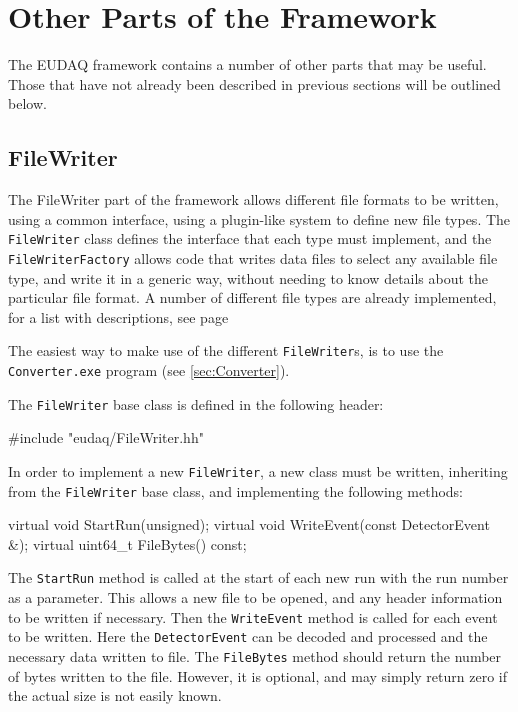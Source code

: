 \section{Other Parts of the Framework}
The EUDAQ framework contains a number of other parts that may be useful.
Those that have not already been described in previous sections will be outlined below.

\subsection{FileWriter}
The FileWriter part of the framework allows different file formats to be written,
using a common interface, using a plugin-like system to define new file types.
The \texttt{FileWriter} class defines the interface that each type must implement,
and the \texttt{FileWriterFactory} allows code that writes data files to select any
available file type, and write it in a generic way,
without needing to know details about the particular file format.
A number of different file types are already implemented,
for a list with descriptions, see page \pageref{lst:FileTypes}

The easiest way to make use of the different \texttt{FileWriter}s,
is to use the \texttt{Converter.exe} program (see \autoref{sec:Converter}).

The \texttt{FileWriter} base class is defined in the following header:
\begin{listing}
#include "eudaq/FileWriter.hh"
\end{listing}

In order to implement a new \texttt{FileWriter}, a new class must be written,
inheriting from the \texttt{FileWriter} base class, and implementing the following methods:
\begin{listing}
virtual void StartRun(unsigned);
virtual void WriteEvent(const DetectorEvent &);
virtual uint64_t FileBytes() const;
\end{listing}

The \texttt{StartRun} method is called at the start of each new run
with the run number as a parameter.
This allows a new file to be opened, and any header information to be written if necessary.
Then the \texttt{WriteEvent} method is called for each event to be written.
Here the \texttt{DetectorEvent} can be decoded and processed
and the necessary data written to file.
The \texttt{FileBytes} method should return the number of bytes written to the file.
However, it is optional, and may simply return zero if the actual size is not easily known.

